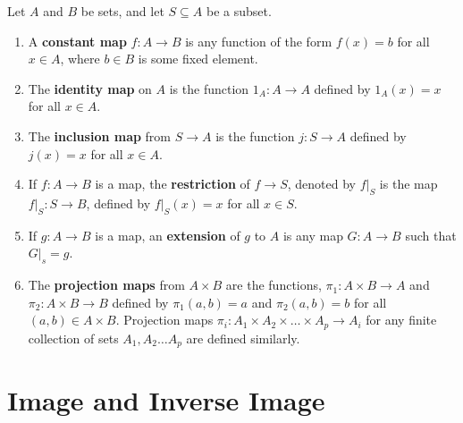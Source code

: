 \documentclass[a4paper,english,12pt]{article}
\begin{document}
\begin{defn}
Let $A$ and $B$ be sets, and let $S \subseteq A$ be a subset. 
\begin{enumerate}
 \item  A \textbf{constant map} $f: A \to B$ is any function of the form $f(x) = b$ for all $x \in A$, where $b \in B$ is some fixed element.
 
 \item  The \textbf{identity map} on $A$ is the function $1_{A}: A \to A$ defined by $1_{A}(x) = x$ for all $x \in A$.

 \item  The \textbf{inclusion map} from $S \to A$ is the function $j: S \to A$ defined by $j(x) = x$ for all $x \in A$.

 \item If $f: A \to B$ is a map, the \textbf{restriction} of $f \to S$, denoted by $f |_{S}$ is the map $f|_{S}: S \to B$, defined by $f|_{S}(x)= x$ for all  $x \in S$.

 \item  If $g: A \to B$ is a map, an \textbf{extension} of $g$ to $A$ is any map $G: A \to B$ such that $G|_{s} = g$.

 \item   The \textbf{projection maps} from $A \times B$ are the functions, $\pi_{1}: A \times B \to A$ and $\pi_{2}: A \times B \to B$ defined by $\pi_{1}(a, b) = a$ and $\pi_{2}(a, b) = b$ for all $(a,b) \in A \times B$. Projection maps $\pi_{i}: A_{1} \times A_{2} \times \dots \times A_{p} \to A_{i}$ for  any finite collection of sets $A_{1}, A_{2} \dots A_{p}$ are defined similarly.
\end{enumerate}
\end{defn}

\section{Image and Inverse Image}
\end{document}
